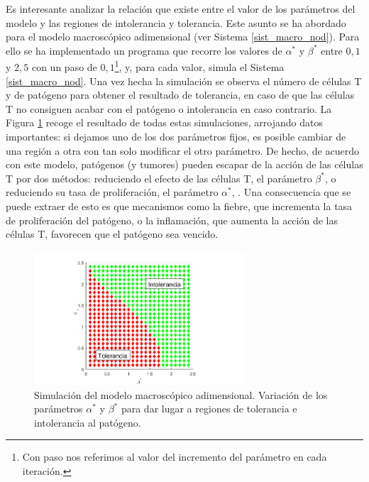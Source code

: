 Es interesante analizar la relación que existe entre el valor de los parámetros del modelo y las regiones de intolerancia y tolerancia. Este asunto se ha abordado para el modelo macroscópico adimensional (ver Sistema \ref{sist_macro_nod}). Para ello se ha implementado un programa que recorre los valores de $\alpha^{*}$ y $\beta^{*}$ entre $0,1$ y $2,5$ con un paso de $0,1$\footnote{Con paso nos referimos al valor del incremento del parámetro en cada iteración.}, y, para cada valor, simula el Sistema \ref{sist_macro_nod}. Una vez hecha la simulación se observa el número de células T y de patógeno para obtener el resultado de tolerancia, en caso de que las células T no consiguen acabar con el patógeno o intolerancia en caso contrario. La Figura \ref{fig:macro_toler_intoler} recoge el resultado de todas estas simulaciones, arrojando datos importantes: si dejamos uno de los dos parámetros fijos, es posible cambiar de una región a otra con tan solo modificar el otro parámetro. De hecho, de acuerdo con este modelo, patógenos (y tumores) pueden escapar de la acción de las células T por dos métodos: reduciendo el efecto de las células T, el parámetro $\beta^{*}$, o reduciendo su tasa de proliferación, el parámetro $\alpha^{*}$, \citep{arias2016emergent}. Una consecuencia que se puede extraer de esto es que mecanismos como la fiebre, que incrementa la tasa de proliferación del patógeno, o la inflamación, que aumenta la acción de las células T, favorecen que el patógeno sea vencido. 

\begin{figure}[H]
	\centering
	\includegraphics[width=0.7\textwidth]{Imagenes/Simulaciones/macro_toler_intoler}
	\caption{Simulación del modelo macroscópico adimensional. Variación de los parámetros $\alpha^{*}$ y $\beta^{*}$ para dar lugar a regiones de tolerancia e intolerancia al patógeno.}
	\label{fig:macro_toler_intoler}
\end{figure}
